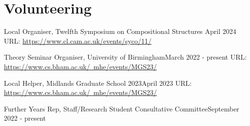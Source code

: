 \section*{Volunteering}
\stroke

\begin{work}{%
    Local Organiser, Twelfth Symposium on Compositional Structures
}{
    April 2024
}%
    \todo[inline]{}
    URL: \href{https://www.cl.cam.ac.uk/events/syco/12/}{https://www.cl.cam.ac.uk/events/syco/11/}
\end{work}

\begin{work}{Theory Seminar Organiser, University of Birmingham}{March 2022 - present}%
    \todo[inline]{}
    URL: \href{https://www.cs.bham.ac.uk/~mhe/events/MGS23/}{https://www.cs.bham.ac.uk/~mhe/events/MGS23/}
\end{work}

\begin{work}{Local Helper, Midlands Graduate School 2023}{April 2023}%
    \todo[inline]{}
    URL: \href{https://www.cs.bham.ac.uk/~mhe/events/MGS23/}{https://www.cs.bham.ac.uk/~mhe/events/MGS23/}
\end{work}

\begin{work}{Further Years Rep, Staff/Research Student Consultative Committee}{September 2022 - present}%
    \todo[inline]{}
\end{work}